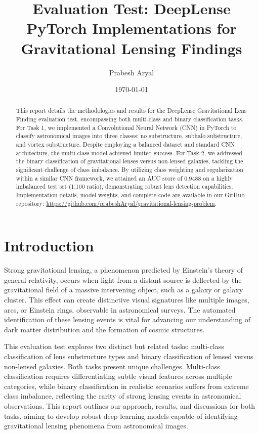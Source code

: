 \documentclass[11pt,a4paper]{article}
\title{ Evaluation Test: DeepLense \\
PyTorch Implementations for Gravitational Lensing Findings}
\author{Prabesh Aryal}
\date{\today}
\begin{document}
\maketitle

\begin{abstract}
This report details the methodologies and results for the DeepLense Gravitational Lens Finding evaluation test, encompassing both multi-class and binary classification tasks. For Task 1, we implemented a Convolutional Neural Network (CNN) in PyTorch to classify astronomical images into three classes: no substructure, subhalo substructure, and vortex substructure. Despite employing a balanced dataset and standard CNN architecture, the multi-class model achieved limited success. For Task 2, we addressed the binary classification of gravitational lenses versus non-lensed galaxies, tackling the significant challenge of class imbalance. By utilizing class weighting and regularization within a similar CNN framework, we attained an AUC score of 0.9488 on a highly imbalanced test set (1:100 ratio), demonstrating robust lens detection capabilities. Implementation details, model weights, and complete code are available in our GitHub repository: \url{https://github.com/prabeshAryal/gravitational-lensing-problem}.
\end{abstract}

\section{Introduction}
Strong gravitational lensing, a phenomenon predicted by Einstein's theory of general relativity, occurs when light from a distant source is deflected by the gravitational field of a massive intervening object, such as a galaxy or galaxy cluster. This effect can create distinctive visual signatures like multiple images, arcs, or Einstein rings, observable in astronomical surveys. The automated identification of these lensing events is vital for advancing our understanding of dark matter distribution and the formation of cosmic structures.

This evaluation test explores two distinct but related tasks: multi-class classification of lens substructure types and binary classification of lensed versus non-lensed galaxies. Both tasks present unique challenges. Multi-class classification requires differentiating subtle visual features across multiple categories, while binary classification in realistic scenarios suffers from extreme class imbalance, reflecting the rarity of strong lensing events in astronomical observations. This report outlines our approach, results, and discussions for both tasks, aiming to develop robust deep learning models capable of identifying gravitational lensing phenomena from astronomical images.
\end{document}
